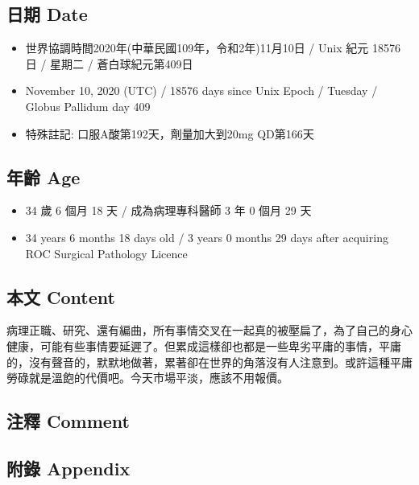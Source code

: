 \documentclass[
]{article}
\providecommand{\tightlist}{%
  \setlength{\itemsep}{0pt}\setlength{\parskip}{0pt}}
\begin{document}
\hypertarget{ux65e5ux671f-date-7}{%
\subsection{日期 Date}\label{ux65e5ux671f-date-7}}

\begin{itemize}
\tightlist
\item
  世界協調時間2020年(中華民國109年，令和2年)11月10日 / Unix 紀元 18576
  日 / 星期二 / 蒼白球紀元第409日
\item
  November 10, 2020 (UTC) / 18576 days since Unix Epoch / Tuesday /
  Globus Pallidum day 409
\item
  特殊註記: 口服A酸第192天，劑量加大到20mg QD第166天
\end{itemize}

\hypertarget{ux5e74ux9f61-age-7}{%
\subsection{年齡 Age}\label{ux5e74ux9f61-age-7}}

\begin{itemize}
\tightlist
\item
  34 歲 6 個月 18 天 / 成為病理專科醫師 3 年 0 個月 29 天
\item
  34 years 6 months 18 days old / 3 years 0 months 29 days after
  acquiring ROC Surgical Pathology Licence
\end{itemize}

\hypertarget{ux672cux6587-content-7}{%
\subsection{本文 Content}\label{ux672cux6587-content-7}}

病理正職、研究、還有編曲，所有事情交叉在一起真的被壓扁了，為了自己的身心健康，可能有些事情要延遲了。但累成這樣卻也都是一些卑劣平庸的事情，平庸的，沒有聲音的，默默地做著，累著卻在世界的角落沒有人注意到。或許這種平庸勞碌就是溫飽的代價吧。今天市場平淡，應該不用報價。

\hypertarget{ux6ce8ux91cb-comment-7}{%
\subsection{注釋 Comment}\label{ux6ce8ux91cb-comment-7}}

\hypertarget{ux9644ux9304-appendix-7}{%
\subsection{附錄 Appendix}\label{ux9644ux9304-appendix-7}}
\end{document}

